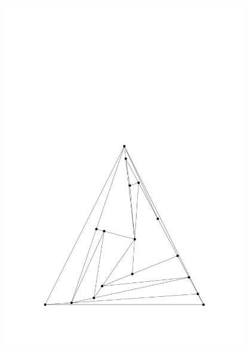 \begin{figure}
\begin{minipage}{0.48\textwidth}
    \includegraphics[width=0.95\textwidth]{vis_17_2.pdf}
  \end{minipage}
      \hfill
\vspace{5mm}
  \begin{minipage}{0.48\textwidth}
  \centering

\end{minipage}
\end{figure}
